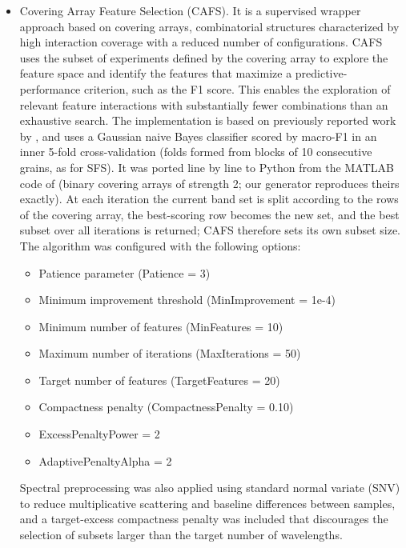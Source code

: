 \documentclass[final,5p,times,twocolumn]{elsarticle}
\newcommand{\added}[1]{{\color{blue}#1}}
\begin{document}
\begin{itemize}
    \item [-] Covering Array Feature Selection (CAFS).
    It is a supervised wrapper approach based on covering arrays, combinatorial structures characterized by high interaction coverage with a reduced number of configurations. 
    CAFS uses the subset of experiments defined by the covering array to explore the feature space and identify the features that maximize a predictive-performance criterion, such as the F1 score.
    This enables the exploration of relevant feature interactions with substantially fewer combinations than an exhaustive search.
    The implementation is based on previously reported work by \citet{Castro2022cafs}, and uses a Gaussian naive Bayes classifier scored by macro-F1 in an inner 5-fold cross-validation \added{(folds formed from blocks of 10 consecutive grains, as for SFS)}. \added{It was ported line by line to Python from the MATLAB code of \citet{Castro2022cafs} (binary covering arrays of strength 2; our generator reproduces theirs exactly). At each iteration the current band set is split according to the rows of the covering array, the best-scoring row becomes the new set, and the best subset over all iterations is returned; CAFS therefore sets its own subset size.}
    The algorithm was configured with the following options: 
    \begin{itemize}
        \item  Patience parameter (Patience = 3)
        \item  Minimum improvement threshold (MinImprovement = 1e-4)
        \item  Minimum number of features (MinFeatures = 10) 
        \item  Maximum number of iterations (MaxIterations = 50)
        \item  Target number of features (TargetFeatures = 20)
        \item  Compactness penalty (CompactnessPenalty = 0.10)
        \item  ExcessPenaltyPower = 2
        \item  AdaptivePenaltyAlpha = 2
    \end{itemize}

     Spectral preprocessing was also applied using standard normal variate (SNV) to reduce multiplicative scattering and baseline differences between samples, and a target-excess compactness penalty was included that discourages the selection of subsets larger than the target number of wavelengths. 
        
\end{itemize}
\end{document}
